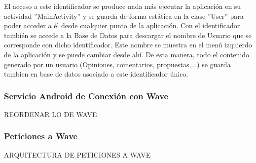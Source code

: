 		El acceso a este identificador se produce nada más ejecutar la aplicación en su actividad ''MainActivity'' y se guarda de forma estática en la clase ''User'' para poder acceder a él desde cualquier punto de la aplicación. Con el identificador también se accede a la Base de Datos para descargar el nombre de Usuario que se corresponde con dicho identificador. Este nombre se muestra en el menú izquierdo de la aplicación y se puede cambiar desde ahí. De esta manera, todo el contenido generado por un usuario (Opiniones, comentarios, propuestas,...) se guarda tambien en base de datos asociado a este identificador único.
		
	\subsubsection{Servicio Android de Conexión con Wave}

		REORDENAR LO DE WAVE
		
	\subsubsection{Peticiones a Wave}

		ARQUITECTURA DE PETICIONES A WAVE
		


